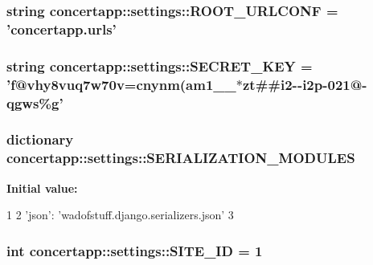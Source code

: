 \hypertarget{namespaceconcertapp_1_1settings_a1aabdd985367ce865a3c75bb1e102b0a}{
\subsubsection[{ROOT\_\-URLCONF}]{\setlength{\rightskip}{0pt plus 5cm}string {\bf concertapp::settings::ROOT\_\-URLCONF} = 'concertapp.urls'}}
\label{namespaceconcertapp_1_1settings_a1aabdd985367ce865a3c75bb1e102b0a}
\hypertarget{namespaceconcertapp_1_1settings_a3b7aebf7d1ca2d1bd0f91d5568436d6a}{
\subsubsection[{SECRET\_\-KEY}]{\setlength{\rightskip}{0pt plus 5cm}string {\bf concertapp::settings::SECRET\_\-KEY} = 'f@vhy8vuq7w70v=cnynm(am1\_\-\_\-$\ast$zt\#\#i2-\/-\/i2p-\/021@-\/qgws\%g'}}
\label{namespaceconcertapp_1_1settings_a3b7aebf7d1ca2d1bd0f91d5568436d6a}
\hypertarget{namespaceconcertapp_1_1settings_a1c98c7474dcc2ff630908e343d75f069}{
\subsubsection[{SERIALIZATION\_\-MODULES}]{\setlength{\rightskip}{0pt plus 5cm}dictionary {\bf concertapp::settings::SERIALIZATION\_\-MODULES}}}
\label{namespaceconcertapp_1_1settings_a1c98c7474dcc2ff630908e343d75f069}
{\bfseries Initial value:}
\begin{DoxyCode}
1 {
2     'json': 'wadofstuff.django.serializers.json'
3 }
\end{DoxyCode}
\hypertarget{namespaceconcertapp_1_1settings_a257dac3a040b91223f0947be327d8872}{
\subsubsection[{SITE\_\-ID}]{\setlength{\rightskip}{0pt plus 5cm}int {\bf concertapp::settings::SITE\_\-ID} = 1}}
